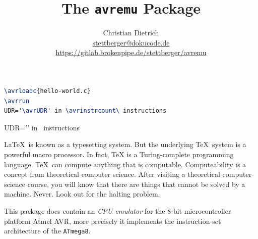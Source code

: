 \documentclass{article}
\title{The \texttt{avremu} Package}
\author{Christian Dietrich\\
\url{stettberger@dokucode.de}\\
\url{https://gitlab.brokenpipe.de/stettberger/avremu}}
\begin{document}
\maketitle

\begin{tcolorbox}
  
  \tcblower
  \begin{lstlisting}[language=TeX]
\avrloadc{hello-world.c}
\avrrun
UDR='\avrUDR' in \avrinstrcount\ instructions
\end{lstlisting}
\end{tcolorbox}
\begin{tcolorbox}
\avrrun
UDR='\avrUDR' in \avrinstrcount\ instructions
\end{tcolorbox}


\LaTeX\ is known as a typesetting system. But the underlying \TeX\ system is a powerful macro
processor. In fact, TeX is a Turing-complete programming language. \TeX\ can compute anything that
is computable. Computeability is a concept from theoretical computer science. After visiting a
theoretical computer-science course, you will know that there are things that cannot be solved by a
machine. Never. Look out for the halting problem. 

This package does contain an \emph{CPU emulator} for the 8-bit microcontroller platform Atmel AVR, more
precisely it implements the instruction-set architecture of the \texttt{ATmega8}.
\end{document}
